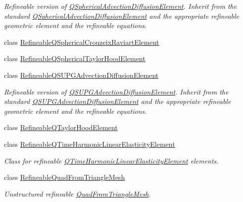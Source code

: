 \begin{DoxyCompactItemize}
\begin{DoxyCompactList}\small\item\em Refineable version of \hyperlink{classoomph_1_1QSphericalAdvectionDiffusionElement}{Q\+Spherical\+Advection\+Diffusion\+Element}. Inherit from the standard \hyperlink{classoomph_1_1QSphericalAdvectionDiffusionElement}{Q\+Spherical\+Advection\+Diffusion\+Element} and the appropriate refineable geometric element and the refineable equations. \end{DoxyCompactList}\item 
class \hyperlink{classoomph_1_1RefineableQSphericalCrouzeixRaviartElement}{Refineable\+Q\+Spherical\+Crouzeix\+Raviart\+Element}
\item 
class \hyperlink{classoomph_1_1RefineableQSphericalTaylorHoodElement}{Refineable\+Q\+Spherical\+Taylor\+Hood\+Element}
\item 
class \hyperlink{classoomph_1_1RefineableQSUPGAdvectionDiffusionElement}{Refineable\+Q\+S\+U\+P\+G\+Advection\+Diffusion\+Element}
\begin{DoxyCompactList}\small\item\em Refineable version of \hyperlink{classoomph_1_1QSUPGAdvectionDiffusionElement}{Q\+S\+U\+P\+G\+Advection\+Diffusion\+Element}. Inherit from the standard \hyperlink{classoomph_1_1QSUPGAdvectionDiffusionElement}{Q\+S\+U\+P\+G\+Advection\+Diffusion\+Element} and the appropriate refineable geometric element and the refineable equations. \end{DoxyCompactList}\item 
class \hyperlink{classoomph_1_1RefineableQTaylorHoodElement}{Refineable\+Q\+Taylor\+Hood\+Element}
\item 
class \hyperlink{classoomph_1_1RefineableQTimeHarmonicLinearElasticityElement}{Refineable\+Q\+Time\+Harmonic\+Linear\+Elasticity\+Element}
\begin{DoxyCompactList}\small\item\em Class for refineable \hyperlink{classoomph_1_1QTimeHarmonicLinearElasticityElement}{Q\+Time\+Harmonic\+Linear\+Elasticity\+Element} elements. \end{DoxyCompactList}\item 
class \hyperlink{classoomph_1_1RefineableQuadFromTriangleMesh}{Refineable\+Quad\+From\+Triangle\+Mesh}
\begin{DoxyCompactList}\small\item\em Unstructured refineable \hyperlink{classoomph_1_1QuadFromTriangleMesh}{Quad\+From\+Triangle\+Mesh}. \end{DoxyCompactList}\item 

\end{DoxyCompactItemize}
